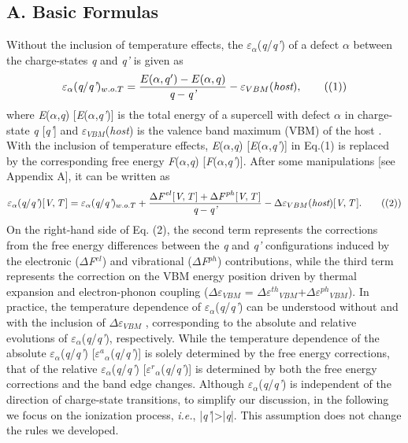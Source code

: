 \documentclass[onecolumn,preprint,superscriptaddress]{revtex4-1}
\begin{document}
\subsection*{A. Basic Formulas}
Without the inclusion of temperature effects, the $\varepsilon$$_{\alpha}$(\emph{q}/\emph{q'}) of a defect $\alpha$ between the charge-states \emph{q} and \emph{q'} is given as
\begin{equation}
\varepsilon_{\alpha}(\emph{q}/\emph{q'})_{w.o.T}=\frac{E(\alpha,q')-E(\alpha,q)}{\emph{q}-\emph{q'}}-\varepsilon_{VBM}(\emph{host}),   \tag{(1)}
\end{equation}
\noindent where \emph{E}($\alpha$,\emph{q}) [\emph{E}($\alpha$,\emph{q'})] is the total energy of a supercell with defect $\alpha$ in charge-state \emph{q} [\emph{q'}] and $\varepsilon$$_{VBM}$(\emph{host}) is the valence band maximum (VBM) of the host \cite{12,13,50}. With the inclusion of temperature effects, \emph{E}($\alpha$,\emph{q}) [\emph{E}($\alpha$,\emph{q'})] in Eq.(1) is replaced by the corresponding free energy \emph{F}($\alpha$,\emph{q}) [\emph{F}($\alpha$,\emph{q'})]. After some manipulations [see Appendix A], it can be written as
\begin{equation}
\varepsilon_{\alpha}(\emph{q}/\emph{q'})[\emph{V},\emph{T}\,] = \varepsilon_{\alpha}(\emph{q}/\emph{q'})_{w.o.T} + \frac{\Delta\emph{F}^{\,el}[\emph{V},\emph{T}\,] + \Delta\emph{F}^{\,ph}[\emph{V},\emph{T}\,]}{\emph{q}-\emph{q'}} - \Delta\varepsilon_{VBM}(\emph{host})[\emph{V},\emph{T}\,].  \tag{(2)}
\end{equation}
\noindent On the right-hand side of Eq. (2), the second term represents the corrections from the free energy differences between the \emph{q} and \emph{q'} configurations induced by the electronic ($\Delta$\emph{F}$^{el}$) and vibrational ($\Delta$\emph{F}$^{ph}$) contributions, while the third term represents the correction on the VBM energy position driven by thermal expansion and electron-phonon coupling ($\Delta$$\varepsilon$$_{VBM}$ = $\Delta$$\varepsilon$$^{th}$$_{VBM}$+$\Delta$$\varepsilon$$^{ph}$$_{VBM}$). In practice, the temperature dependence of $\varepsilon$$_{\alpha}$(\emph{q}/\emph{q'}) can be understood without and with the inclusion of $\Delta$$\varepsilon$$_{VBM}$ \cite{45}, corresponding to the absolute and relative evolutions of $\varepsilon$$_{\alpha}$(\emph{q}/\emph{q'}), respectively. While the temperature dependence of the absolute $\varepsilon$$_{\alpha}$(\emph{q}/\emph{q'}) [$\varepsilon$$^{a}$$_{\alpha}$(\emph{q}/\emph{q'})] is solely determined by the free energy corrections, that of the relative $\varepsilon$$_{\alpha}$(\emph{q}/\emph{q'}) [$\varepsilon$$^{r}$$_{\alpha}$(\emph{q}/\emph{q'})] is determined by both the free energy corrections and the band edge changes. Although $\varepsilon$$_{\alpha}$(\emph{q}/\emph{q'}) is independent of the direction of charge-state transitions, to simplify our discussion, in the following we focus on the ionization process, \emph{i.e.}, |\emph{q'}|>|\emph{q}|. This assumption does not change the rules we developed.
\end{document}
